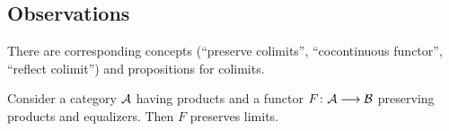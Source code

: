 \subsection{Observations}
  \begin{ex}
    There are corresponding concepts (``preserve colimits'', ``cocontinuous functor'', ``reflect colimit'') and propositions for colimits.
  \end{ex}
  \begin{ex}
    Consider a category ${\cal A}$ having products and a functor $F\colon{\cal A}\longrightarrow{\cal B}$ preserving products and equalizers. Then $F$ preserves limits.
  \end{ex}


